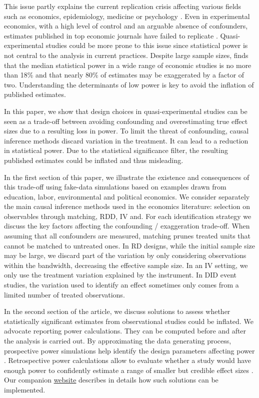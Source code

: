 \documentclass[12pt]{article}
\begin{document}
This issue partly explains the current replication crisis affecting various fields such as economics, epidemiology, medicine or psychology \citep{button_power_2013, open_science_collaboration_estimating_2015, camerer_evaluating_2016, chang_is_2022}. Even in experimental economics, with a high level of control and an arguable absence of confounders, estimates published in top economic journals have failed to replicate \cite{camerer_evaluating_2016}. Quasi-experimental studies could be more prone to this issue since statistical power is not central to the analysis in current practices. Despite large sample sizes, \cite{ioannidis_power_2017} finds that the median statistical power in a wide range of economic studies is no more than 18\% and that nearly 80\% of estimates may be exaggerated by a factor of two. Understanding the determinants of low power is key to avoid the inflation of published estimates. 

In this paper, we show that design choices in quasi-experimental studies can be seen as a trade-off between avoiding confounding and overestimating true effect sizes due to a resulting loss in power. To limit the threat of confounding, causal inference methods discard variation in the treatment. It can lead to a reduction in statistical power. Due to the statistical significance filter, the resulting published estimates could be inflated and thus misleading. 

In the first section of this paper, we illustrate the existence and consequences of this trade-off using fake-data simulations based on examples drawn from education, labor, environmental and political economics. We consider separately the main causal inference methods used in the economics literature: selection on observables through matching, RDD, IV and. For each identification strategy we discuss the key factors affecting the confounding / exaggeration trade-off.  When assuming that all confounders are measured, matching prunes treated units that cannot be matched to untreated ones. In RD designs, while the initial sample size may be large, we discard part of the variation by only considering observations within the bandwidth, decreasing the effective sample size. In an IV setting, we only use the treatment variation explained by the instrument. In DID event studies, the variation used to identify an effect sometimes only comes from a limited number of treated observations.

In the second section of the article, we discuss solutions to assess whether statistically significant estimates from observational studies could be inflated. We advocate reporting power calculations. They can be computed before and after the analysis is carried out. By approximating the data generating process, prospective power simulations help identify the design parameters affecting power \citep{gelman_regression_2020, black_simulated_2021}. Retrospective power calculations allow to evaluate whether a study would have enough power to confidently estimate a range of smaller but credible effect sizes \citep{gelman_beyond_2014, stommes_reliability_2021}. Our companion \href{https://vincentbagilet.github.io/causal_inflation/}{website} describes in details how such solutions can be implemented. 
\end{document}
